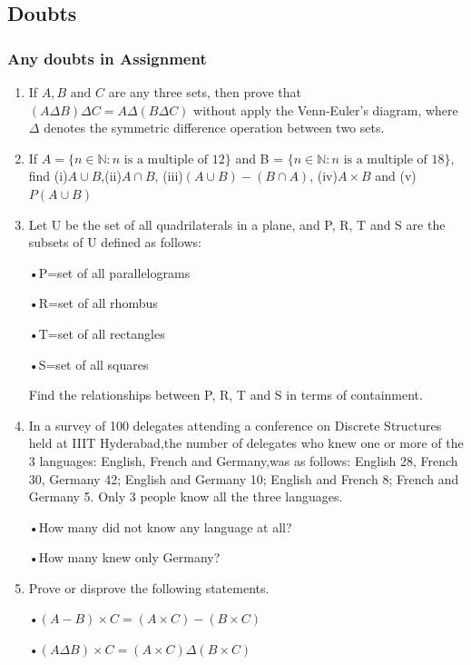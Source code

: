 \documentclass[xcolor=svgnames]{beamer}
\begin{document}
\subsection{Doubts}
\begin{frame}
\frametitle{Any doubts in Assignment}
\begin{enumerate}
    \item If $A, B \text{ and } C$ are any three sets,  then prove that $(A\Delta B)\Delta C=A\Delta(B\Delta C)$ without apply the Venn-Euler’s diagram, where $\Delta$ denotes the symmetric difference operation between two sets.
    \item If $A= \{ n \in \mathbb{N}: n \text{ is a multiple of 12}\}$ and B = $\{n \in \mathbb{N}:n \text{ is a multiple of 18}\}$, find (i)$A \cup B$,(ii)$A \cap B$, (iii)$(A \cup B)−(B \cap A)$, (iv)$A \times B$ and (v)$P(A \cup B)$
    \item  Let U be the set of all quadrilaterals in a plane, and P, R, T and S are the subsets of U defined as follows:
   
    •P=set of all parallelograms
    
    •R=set of all rhombus
    
    •T=set of all rectangles
    
    •S=set of all squares
    
    Find the relationships between P, R, T and S in terms of containment.
\end{enumerate}
\end{frame}
\begin{frame}{}
\begin{enumerate}\setcounter{enumi}{3}
        \item In a survey of 100 delegates attending a conference on Discrete Structures held at IIIT Hyderabad,the number of delegates who knew one or more of the 3 languages: English, French and Germany,was as follows: English 28, French 30, Germany 42; English and Germany 10; English and French 8; French and Germany 5. Only 3 people know all the three languages.
    
    •How many did not know any language at all?
    
    •How many knew only Germany?
    \item Prove or disprove the following statements.
    
    •$(A - B) \times C= (A \times C) - (B \times C)$
    
    •$(A \Delta B) \times C= (A \times C) \Delta (B \times C)$
\end{enumerate}

\end{frame}
\end{document}
